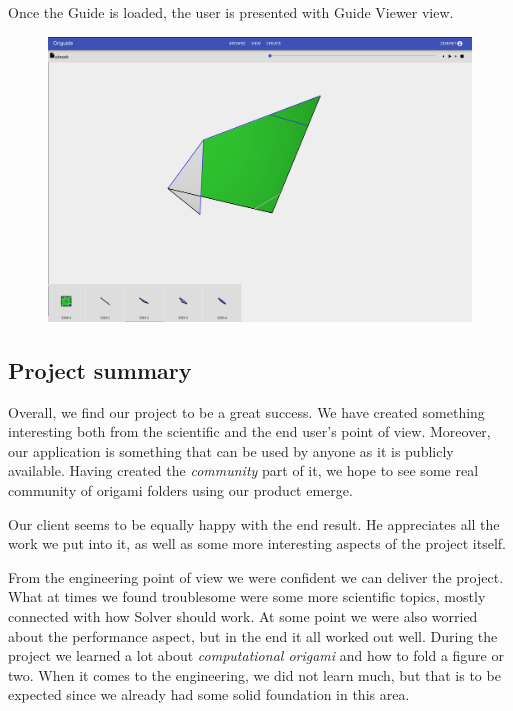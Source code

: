 Once the Guide is loaded, the user is presented with Guide Viewer view.

\begin{figure}[H]
  	\centering
    \includegraphics[width=\textwidth]{assets/5-folderView.png}
\end{figure}


\subsection{Project summary}

Overall, we find our project to be a great success.
We have created something interesting both from the scientific and the end user's
point of view. Moreover, our application is something that can be used
by anyone as it is publicly available. Having created the \textit{community}
part of it, we hope to see some real community of origami folders using our product emerge.
\smallskip

Our client seems to be equally happy with the end result.
He appreciates all the work we put into it, 
as well as some more interesting aspects of the project itself.
\smallskip

From the engineering point of view we were confident we can deliver the project.
What at times we found troublesome were some more scientific topics, mostly
connected with how Solver should work.
At some point we were also worried about the performance aspect, but in the end it all worked out well.
During the project we learned a lot about \textit{computational origami} and how to fold a figure or two.
When it comes to the engineering, we did not learn much, but
that is to be expected since we already had some solid foundation in this area.
\smallskip

